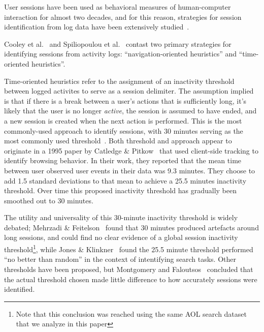 User sessions have been used as behavioral measures of human-computer interaction for almost two decades, and for this reason, strategies for session identification from log data have been extensively studied~\cite{eickhoff2014lessons}.

Cooley et al.~\cite{cooley1999data} and Spiliopoulou et al.~\cite{spiliopoulou2003framework} contast two primary strategies for identifying sessions from activity logs: ``navigation-oriented heuristics'' and ``time-oriented heuristics''.

Time-oriented heuristics refer to the assignment of an inactivity threshold between logged activites to serve as a session delimiter.  The assumption implied is that if there is a break between a user's actions that is sufficiently long, it's likely that the user is no longer \emph{active}, the session is assumed to have ended, and a new session is created when the next action is performed. This is the most commonly-used approach to identify sessions, with 30 minutes serving as the most commonly used threshold~\cite{eickhoff2014lessons,spiliopoulou2003framework,ortega2010differences}.  Both threshold and approach appear to originate in a 1995 paper by Catledge \& Pitkow~\cite{catledge1995characterizing} that used client-side tracking to identify browsing behavior. In their work, they reported that the mean time between user observed user events in their data was 9.3 minutes.  They choose to add 1.5 standard deviations to that mean to achieve a 25.5 minutes inactivity threshold.  Over time this proposed inactivity threshold has gradually been smoothed out to 30 minutes.

The utility and universality of this 30-minute inactivity threshold is widely debated; Mehrzadi \& Feitelson~\cite{mehrzadi2012onextracting} found that 30 minutes produced artefacts around long sessions, and could find no clear evidence of a global session inactivity threshold\footnote{Note that this conclusion was reached using the same AOL search dataset that we analyze in this paper}, while Jones \& Klinkner~\cite{jones2008beyond} found the 25.5 minute threshold performed ``no better than random'' in the context of intentifying search tasks. Other thresholds have been proposed, but Montgomery and Faloutsos~\cite{montgomery2001identifying} concluded that the actual threshold chosen made little difference to how accurately sessions were identified.

